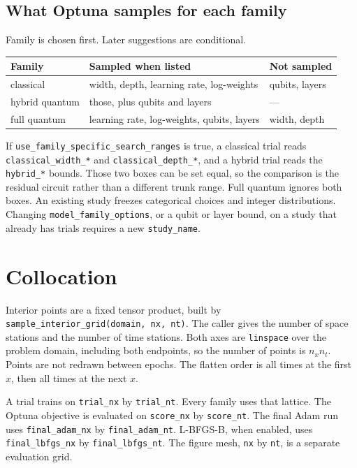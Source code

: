 \documentclass[11pt]{article}
\begin{document}
\subsection{What Optuna samples for each family}

Family is chosen first.
Later suggestions are conditional.

\begin{center}
\begin{tabular}{@{}lll@{}}
\toprule
Family & Sampled when listed & Not sampled \\
\midrule
classical & width, depth, learning rate, log-weights & qubits, layers \\
hybrid quantum & those, plus qubits and layers & --- \\
full quantum & learning rate, log-weights, qubits, layers & width, depth \\
\bottomrule
\end{tabular}
\end{center}

If \texttt{use\_family\_specific\_search\_ranges} is true, a classical trial reads \texttt{classical\_width\_*} and \texttt{classical\_depth\_*}, and a hybrid trial reads the \texttt{hybrid\_*} bounds.
Those two boxes can be set equal, so the comparison is the residual circuit rather than a different trunk range.
Full quantum ignores both boxes.
An existing study freezes categorical choices and integer distributions.
Changing \texttt{model\_family\_options}, or a qubit or layer bound, on a study that already has trials requires a new \texttt{study\_name}.

\section{Collocation}

Interior points are a fixed tensor product, built by \texttt{sample\_interior\_grid(domain, nx, nt)}.
The caller gives the number of space stations and the number of time stations.
Both axes are \texttt{linspace} over the problem domain, including both endpoints, so the number of points is \(n_{x}n_{t}\).
Points are not redrawn between epochs.
The flatten order is all times at the first \(x\), then all times at the next \(x\).

A trial trains on \texttt{trial\_nx} by \texttt{trial\_nt}.
Every family uses that lattice.
The Optuna objective is evaluated on \texttt{score\_nx} by \texttt{score\_nt}.
The final Adam run uses \texttt{final\_adam\_nx} by \texttt{final\_adam\_nt}.
L-BFGS-B, when enabled, uses \texttt{final\_lbfgs\_nx} by \texttt{final\_lbfgs\_nt}.
The figure mesh, \texttt{nx} by \texttt{nt}, is a separate evaluation grid.
\end{document}
